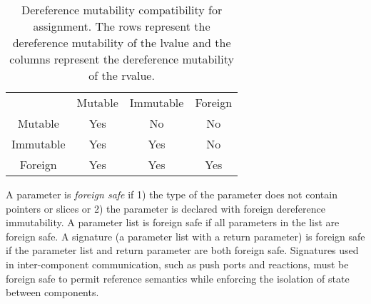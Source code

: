
\begin{table}
  \centering
  \begin{tabular}{cccc}
              & Mutable & Immutable & Foreign \\
    Mutable   & Yes     & No        & No      \\
    Immutable & Yes     & Yes       & No      \\
    Foreign   & Yes     & Yes       & Yes     \\
    \end{tabular}
  \caption{Dereference mutability compatibility for assignment.  The rows represent the dereference mutability of the lvalue and the columns represent the dereference mutability of the rvalue.\label{assignmut}}
\end{table}

A parameter is \emph{foreign safe} if 1) the type of the parameter does not contain pointers or slices or 2) the parameter is declared with foreign dereference immutability.
A parameter list is foreign safe if all parameters in the list are foreign safe.
A signature (a parameter list with a return parameter) is foreign safe if the parameter list and return parameter are both foreign safe.
Signatures used in inter-component communication, such as push ports and reactions, must be foreign safe to permit reference semantics while enforcing the isolation of state between components.

